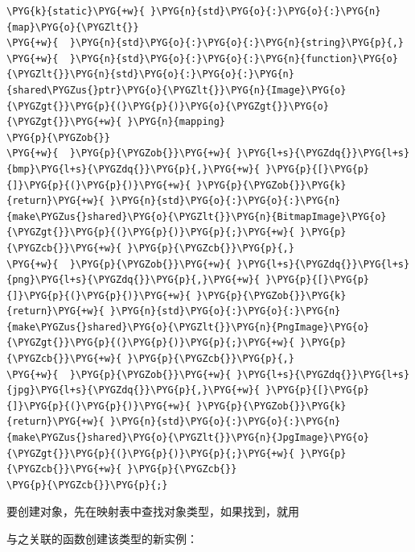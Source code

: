 \begin{codeblockbg}
\begin{Verbatim}[commandchars=\\\{\},breaklines=true,breakanywhere=true,fontsize=\codefont,xleftmargin=17bp]
\PYG{k}{static}\PYG{+w}{ }\PYG{n}{std}\PYG{o}{:}\PYG{o}{:}\PYG{n}{map}\PYG{o}{\PYGZlt{}}
\PYG{+w}{  }\PYG{n}{std}\PYG{o}{:}\PYG{o}{:}\PYG{n}{string}\PYG{p}{,}
\PYG{+w}{  }\PYG{n}{std}\PYG{o}{:}\PYG{o}{:}\PYG{n}{function}\PYG{o}{\PYGZlt{}}\PYG{n}{std}\PYG{o}{:}\PYG{o}{:}\PYG{n}{shared\PYGZus{}ptr}\PYG{o}{\PYGZlt{}}\PYG{n}{Image}\PYG{o}{\PYGZgt{}}\PYG{p}{(}\PYG{p}{)}\PYG{o}{\PYGZgt{}}\PYG{o}{\PYGZgt{}}\PYG{+w}{ }\PYG{n}{mapping}
\PYG{p}{\PYGZob{}}
\PYG{+w}{  }\PYG{p}{\PYGZob{}}\PYG{+w}{ }\PYG{l+s}{\PYGZdq{}}\PYG{l+s}{bmp}\PYG{l+s}{\PYGZdq{}}\PYG{p}{,}\PYG{+w}{ }\PYG{p}{[}\PYG{p}{]}\PYG{p}{(}\PYG{p}{)}\PYG{+w}{ }\PYG{p}{\PYGZob{}}\PYG{k}{return}\PYG{+w}{ }\PYG{n}{std}\PYG{o}{:}\PYG{o}{:}\PYG{n}{make\PYGZus{}shared}\PYG{o}{\PYGZlt{}}\PYG{n}{BitmapImage}\PYG{o}{\PYGZgt{}}\PYG{p}{(}\PYG{p}{)}\PYG{p}{;}\PYG{+w}{ }\PYG{p}{\PYGZcb{}}\PYG{+w}{ }\PYG{p}{\PYGZcb{}}\PYG{p}{,}
\PYG{+w}{  }\PYG{p}{\PYGZob{}}\PYG{+w}{ }\PYG{l+s}{\PYGZdq{}}\PYG{l+s}{png}\PYG{l+s}{\PYGZdq{}}\PYG{p}{,}\PYG{+w}{ }\PYG{p}{[}\PYG{p}{]}\PYG{p}{(}\PYG{p}{)}\PYG{+w}{ }\PYG{p}{\PYGZob{}}\PYG{k}{return}\PYG{+w}{ }\PYG{n}{std}\PYG{o}{:}\PYG{o}{:}\PYG{n}{make\PYGZus{}shared}\PYG{o}{\PYGZlt{}}\PYG{n}{PngImage}\PYG{o}{\PYGZgt{}}\PYG{p}{(}\PYG{p}{)}\PYG{p}{;}\PYG{+w}{ }\PYG{p}{\PYGZcb{}}\PYG{+w}{ }\PYG{p}{\PYGZcb{}}\PYG{p}{,}
\PYG{+w}{  }\PYG{p}{\PYGZob{}}\PYG{+w}{ }\PYG{l+s}{\PYGZdq{}}\PYG{l+s}{jpg}\PYG{l+s}{\PYGZdq{}}\PYG{p}{,}\PYG{+w}{ }\PYG{p}{[}\PYG{p}{]}\PYG{p}{(}\PYG{p}{)}\PYG{+w}{ }\PYG{p}{\PYGZob{}}\PYG{k}{return}\PYG{+w}{ }\PYG{n}{std}\PYG{o}{:}\PYG{o}{:}\PYG{n}{make\PYGZus{}shared}\PYG{o}{\PYGZlt{}}\PYG{n}{JpgImage}\PYG{o}{\PYGZgt{}}\PYG{p}{(}\PYG{p}{)}\PYG{p}{;}\PYG{+w}{ }\PYG{p}{\PYGZcb{}}\PYG{+w}{ }\PYG{p}{\PYGZcb{}}
\PYG{p}{\PYGZcb{}}\PYG{p}{;}
\end{Verbatim}
\end{codeblockbg}



要创建对象，先在映射表中查找对象类型，如果找到，就用



与之关联的函数创建该类型的新实例：




